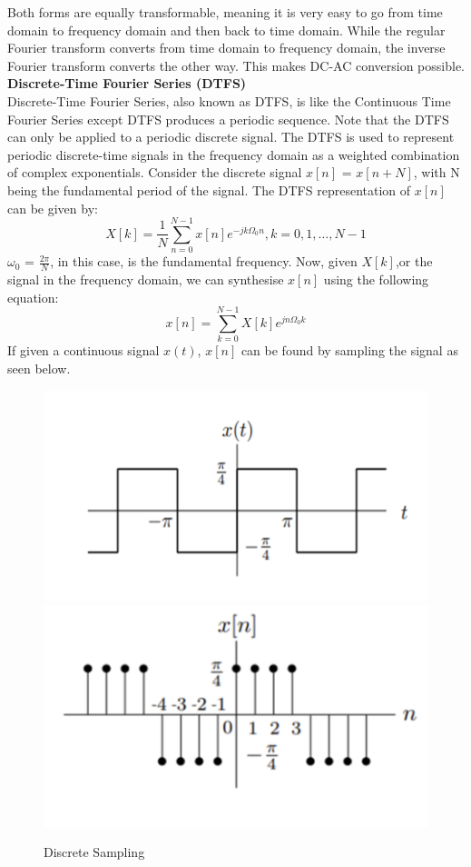 \documentclass[12pt,a4paper]{article}
\begin{document}
Both forms are equally transformable, meaning it is very easy to go from time domain to frequency domain and then back to time domain. While the regular Fourier transform converts from time domain to frequency domain, the inverse Fourier transform converts the other way. This makes DC-AC conversion possible.
\bigskip\\
\textbf{Discrete-Time Fourier Series (DTFS)}\\
Discrete-Time Fourier Series, also known as DTFS, is like the Continuous Time Fourier Series except DTFS produces a periodic sequence. Note that the DTFS can only be applied to a periodic discrete signal. The DTFS is used to represent periodic discrete-time signals in the frequency domain as a weighted combination of complex exponentials.
Consider the discrete signal $x[n]$ = $x[n + N]$, with N being the fundamental period of the signal. The DTFS representation of $x[n]$ can be given by:
$$
    X[k] = \frac{1}{N} \sum^{N-1}_{n=0} x[n]e^{-jk\Omega_0n},k = 0,1,\ldots, N-1
$$
$\omega_0$ = $\frac{2\pi}{N}$, in this case, is the fundamental frequency. Now, given $X[k]$,or the signal in the frequency domain, we can synthesise $x[n]$ using the following equation:
$$
    x[n] = \sum^{N-1}_{k=0} X[k]e^{jn\Omega_0k}
$$
\newpage
If given a continuous signal $x(t)$, $x[n]$ can be found by sampling the signal as seen below.
\begin{figure}[H]
	\begin{center}
		\includegraphics[width=0.6\linewidth]{sampling_1}
		\includegraphics[width=0.6\linewidth]{sampling_2}
	\end{center}
	\caption{Discrete Sampling}
\end{figure}
\end{document}
